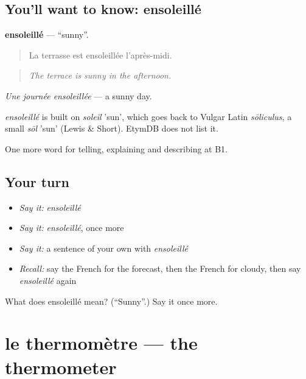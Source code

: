 \subsection*{You'll want to know: ensoleillé}
\textbf{ensoleillé} — \textquotedblleft{}sunny\textquotedblright{}.

\begin{quote}
La terrasse est ensoleillée l'après-midi.
\end{quote}

\begin{quote}
\emph{The terrace is sunny in the afternoon.}
\end{quote}

\emph{Une journée ensoleillée} — a sunny day.

\begin{cousinweb}
\emph{ensoleillé} is built on \emph{soleil} 'sun', which goes back to Vulgar Latin \emph{sōliculus}, a small \emph{sōl} 'sun' (Lewis \& Short). EtymDB does not list it.
\end{cousinweb}

\begin{grammarlens}[title={What you've built}]
One more word for telling, explaining and describing at B1.
\end{grammarlens}

\subsection*{Your turn}
\begin{itemize}
\raggedright
  \item \emph{Say it:} \emph{ensoleillé}
  \item \emph{Say it:} \emph{ensoleillé}, once more
  \item \emph{Say it:} a sentence of your own with \emph{ensoleillé}
  \item \emph{Recall:} say the French for the forecast, then the French for cloudy, then say \emph{ensoleillé} again
\end{itemize}

\begin{tcolorbox}[breakable,colback=teal!4,colframe=teal!35!black,title={Before you move on}]
What does ensoleillé mean? (\textquotedblleft{}Sunny\textquotedblright{}.) Say it once more.
\end{tcolorbox}
\section[le thermomètre]{le thermomètre — the thermometer}


